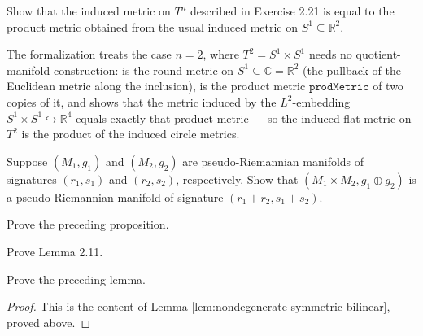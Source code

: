 \begin{exercise}
\label{exer:product-metric-torus}


Show that the induced metric on $T^n$ described in Exercise 2.21 is equal to the product metric obtained from the usual induced metric on $S^1 \subseteq \mathbb{R}^2$.

The formalization treats the case $n = 2$, where $T^2 = S^1 \times S^1$ needs no quotient-manifold construction:  is the round metric on $S^1 \subseteq \mathbb{C} = \mathbb{R}^2$ (the pullback of the Euclidean metric along the inclusion),  is the product metric $\mathtt{prodMetric}$ of two copies of it, and  shows that the metric induced by the $L^2$-embedding $S^1 \times S^1 \hookrightarrow \mathbb{R}^4$ equals exactly that product metric --- so the induced flat metric on $T^2$ is the product of the induced circle metrics.
\end{exercise}

\begin{exercise}
\label{exer:product-pseudo-riemannian}

Suppose $(M_1, g_1)$ and $(M_2, g_2)$ are pseudo-Riemannian manifolds of signatures $(r_1, s_1)$ and $(r_2, s_2)$, respectively. Show that $(M_1 \times M_2, g_1 \oplus g_2)$ is a pseudo-Riemannian manifold of signature $(r_1 + r_2, s_1 + s_2)$.
\end{exercise}

\begin{exercise}
\label{exer:prove-isometry-invariance}


Prove the preceding proposition.
\end{exercise}

\begin{exercise}
\label{exer:prove-lemma-2-11}


Prove Lemma 2.11.
\end{exercise}

\begin{exercise}
\label{exer:prove-nondegenerate-equivalent}

Prove the preceding lemma.
\end{exercise}
\begin{proof}

This is the content of Lemma \ref{lem:nondegenerate-symmetric-bilinear}, proved above.
\end{proof}

